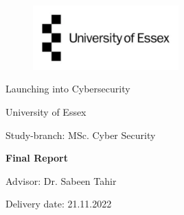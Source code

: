 
\label{titlePage}
\begin{figure}[h]
\centering
\includegraphics[width=0.50\textwidth]{pics/logo.pdf}
\end{figure}
\FloatBarrier

\begin{Large} 
\begin{center}
Launching into Cybersecurity
\end{center}
\end{Large} 

\vspace*{5mm}

\begin{large} 
\begin{center}
University of Essex
\end{center}
\end{large} 

\begin{large} 
\begin{center}
Study-branch: MSc. Cyber Security
\end{center}
\end{large}



\begin{Large} 
\begin{center}
\textbf{Final Report}
\end{center}
\end{Large}

\vspace*{5mm}


\begin{large} 
\begin{center}
Advisor: Dr. Sabeen Tahir
\end{center}
\end{large} 


\vspace*{-6mm}

\begin{large} 
\begin{center}
Delivery date: 21.11.2022
\end{center}
\end{large} 


\pagestyle{empty} %

